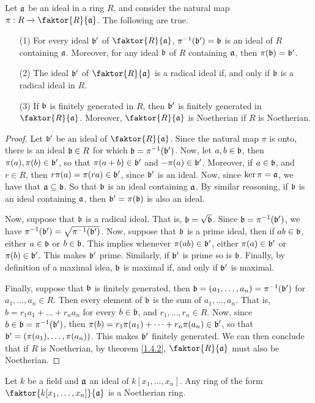  \begin{theorem}\label{1.4.4}
     Let $\af$ be an ideal in a ring $R$, and consider the natural map $\pi:R
     \xrightarrow{} \faktor{R}{\af}$. The following are true.
     \begin{enumerate}
         \item[(1)] For every ideal $\bf'$ of $\faktor{R}{\af}$,
             $\inv{\pi}(\bf')=\bf$ is an ideal of $R$ containing $\af$.
             Moreover, for any ideal $\bf$ of $R$ containing $\af$, then
             $\pi(\bf)=\bf'$.

         \item[(2)] The ideal $\bf'$ of $\faktor{R}{\af}$ is a radical ideal if,
             and only if $\bf$ is a radical ideal in $R$.

         \item[(3)] If $\bf$ is finitely generated in $R$, then $\bf'$ is
             finitely generated in $\faktor{R}{\af}$. Moreover,
             $\faktor{R}{\af}$ is Noetherian if $R$ is Noetherian.
     \end{enumerate}
 \end{theorem}
 \begin{proof}
     Let $\bf'$ be an ideal of $\faktor{R}{\af}$. Since the natural map $\pi$ is
     onto, there is an ideal $\bf \in R$ for which $\bf=\inv{\pi}(\bf')$. Now,
     let $a,b \in \bf$, then $\pi(a),\pi(b) \in \bf'$, so that $\pi(a+b) \in
     \bf'$ and $-\pi(a) \in \bf'$. Moreover, if $a \in \bf$, and $r \in R$, then
     $r\pi(a)=\pi(ra) \in \bf'$, since $\bf'$ is an ideal. Now, since
     $\ker{\pi}=\af$, we have that $\af \subseteq \bf$. So that $\bf$ is an
     ideal containing $\af$. By similar reasoning, if $\bf$ is an ideal
     containing $\af$, then $\bf'=\pi(\bf)$ is also an ideal.

     Now, suppose that $\bf$ is a radical ideal. That is, $\bf=\sqrt{\bf}$. Since
     $\bf=\inv{\pi}(\bf')$, we have $\inv{\pi}(\bf')=\sqrt{\inv{\pi}(\bf')}$.
     Now, suppose that $\bf$ is a prime ideal, then if $ab \in \bf$, either $a
     \in \bf$ or $b \in \bf$. This implies whenever $\pi(ab) \in \bf'$, either
     $\pi(a) \in \bf'$ or $\pi(b) \in \bf'$. This makes $\bf'$ prime. Similarly,
     if $\bf'$ is prime so is $\bf$. Finally, by definition of a maximal idea,
     $\bf$ is maximal if, and only if $\bf'$ is maximal.

     Finally, suppose that $\bf$ is finitely generated, then $\bf=(a_1, \dots,
     a_n)=\inv{\pi}(\bf')$ for $a_1, \dots, a_n \in R$. Then every element of
     $\bf$ is the sum of $a_1, \dots, a_n$. That is, $b=r_1a_1+\dots+r_na_n$ for
     every $b \in \bf$, and $r_1, \dots, r_n \in R$. Now, since $b \in
     \bf=\inv{\pi}(\bf')$, then $\pi(b)=r_1\pi(a_1)+\dots+r_n\pi(a_n) \in \bf'$,
     so that $\bf'=(\pi(a_1), \dots, \pi(a_n))$. This makes $\bf'$ finitely
     generated. We can then conclude that if $R$ is Noetherian, by theorem
     \ref{1.4.2}, $\faktor{R}{\af}$ must also be Noetherian.
 \end{proof}
 \begin{corollary}
     Let $k$ be a field and $\af$ an ideal of $k[x_1, \dots, x_n]$. Any ring of
     the form $\faktor{k[x_1, \dots, x_n]}{\af}$ is a Noetherian ring.
 \end{corollary}
